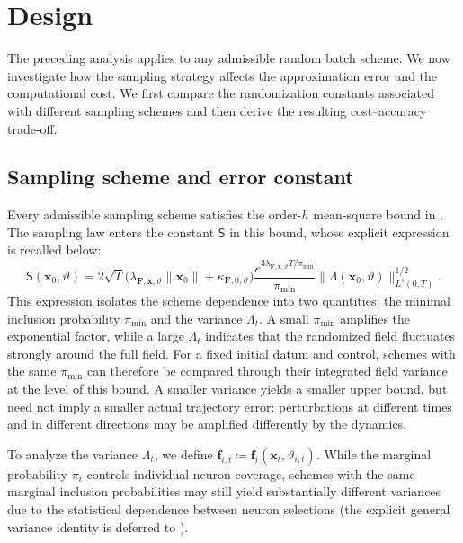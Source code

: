 \documentclass[twoside,11pt]{article}
\theoremstyle{plain}
\newcommand{\bff}{\mathbf{f}}
\newcommand{\bfF}{\mathbf{F}}
\newcommand{\bfx}{\mathbf{x}}
\begin{document}


\section{Design}\label{sec:design}

The preceding analysis applies to any admissible random batch scheme. We now
investigate how the sampling strategy affects the approximation error and
the computational cost. We first compare the randomization constants
associated with different sampling schemes and then derive the resulting
cost--accuracy trade-off.


\subsection{Sampling scheme and error constant}\label{ss:varsamp}

Every admissible sampling scheme satisfies the order-$h$ mean-square bound in . The sampling law enters the constant $\mathsf S$ in this bound, whose explicit expression is recalled below:
\begin{equation}\label{eq:S_factorized}
\mathsf S(\bfx_0,\vartheta)
=
2\sqrt{T}
\bigl(
\lambda_{\bfF,\bfx,\vartheta}\|\bfx_0\|
+\kappa_{\bfF,0,\vartheta}
\bigr)
\frac{e^{3\lambda_{\bfF,\bfx,\vartheta}T/\pi_{\min}}}{\pi_{\min}}
\|\Lambda(\bfx_0,\vartheta)\|_{L^1(0,T)}^{1/2}.
\end{equation}
This expression isolates the scheme dependence into two quantities: the minimal inclusion probability $\pi_{\min}$ and the variance $\Lambda_t$. A small $\pi_{\min}$ amplifies the exponential factor, while a large $\Lambda_t$ indicates that the randomized field fluctuates strongly around the full field. For a fixed initial datum and control, schemes with the same $\pi_{\min}$ can therefore be compared through their integrated field variance at the level of this bound. A smaller variance yields a smaller upper bound, but need not imply a smaller actual trajectory error: perturbations at different times and in different directions may be amplified differently by the dynamics.

To analyze the variance $\Lambda_t$, we define $\bff_{i,t} \coloneqq \bff_i(\bfx_t,\vartheta_{i,t})$. While the marginal probability $\pi_i$ controls individual neuron coverage, schemes with the same marginal inclusion probabilities may still yield substantially different variances due to the statistical dependence between neuron selections (the explicit general variance identity is deferred to ). 
\end{document}

